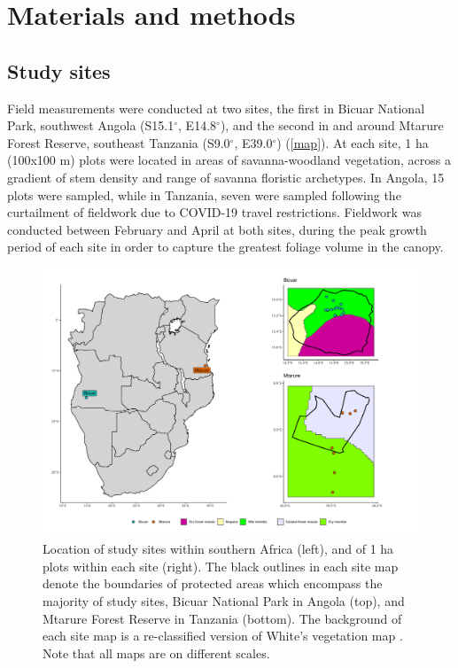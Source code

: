 \documentclass[11pt,a4paper]{article}
\begin{document}
\section{Materials and methods}

\subsection{Study sites}

Field measurements were conducted at two sites, the first in Bicuar National Park, southwest Angola (S15.1$^\circ$, E14.8$^\circ$), and the second in and around Mtarure Forest Reserve, southeast Tanzania (S9.0$^\circ$, E39.0$^\circ$) (\autoref{map}). At each site, 1 ha (100x100 m) plots were located in areas of savanna-woodland vegetation, across a gradient of stem density and range of savanna floristic archetypes. In Angola, 15 plots were sampled, while in Tanzania, seven were sampled following the curtailment of fieldwork due to COVID-19 travel restrictions. Fieldwork was conducted between February and April at both sites, during the peak growth period of each site in order to capture the greatest foliage volume in the canopy.

\begin{figure}
	\includegraphics[width=\textwidth]{map}
	\caption{Location of study sites within southern Africa (left), and of 1 ha plots within each site (right). The black outlines in each site map denote the boundaries of protected areas which encompass the majority of study sites, Bicuar National Park in Angola (top), and Mtarure Forest Reserve in Tanzania (bottom). The background of each site map is a re-classified version of White's vegetation map \citep{White1983}. Note that all maps are on different scales.}
	\label{map}
\end{figure}
\end{document}
